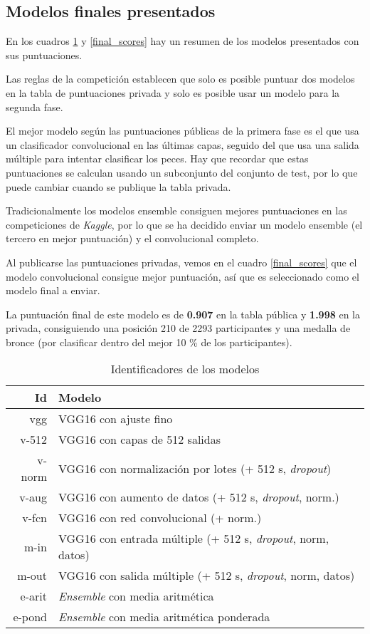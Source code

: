 \begin{itemize}
\section{Modelos finales presentados}

En los cuadros \ref{model_id} y \ref{final_scores} hay un resumen de los
modelos presentados con sus puntuaciones.

Las reglas de la competición establecen que solo es posible puntuar dos modelos en la tabla de puntuaciones privada y solo es posible usar un modelo para la segunda fase.

El mejor modelo según las puntuaciones públicas de la primera fase es el que usa un clasificador convolucional en las últimas capas, seguido del que usa una salida múltiple para intentar clasificar los peces. Hay que recordar que estas puntuaciones se calculan usando un subconjunto del conjunto de test, por lo que puede cambiar cuando se publique la tabla privada.

Tradicionalmente los modelos ensemble consiguen mejores puntuaciones en las competiciones de \textit{Kaggle}, por lo que se ha decidido enviar un modelo ensemble (el tercero en mejor puntuación) y el convolucional completo.

Al publicarse las puntuaciones privadas, vemos en el cuadro \ref{final_scores} que el modelo convolucional consigue mejor puntuación, así que es seleccionado como el modelo final a enviar.

La puntuación final de este modelo es de \textbf{0.907} en la tabla pública y \textbf{1.998} en la privada, consiguiendo una posición 210 de 2293 participantes y una medalla de bronce (por clasificar dentro del mejor 10 \% de los participantes).

\begin{table}[]
\centering
\caption{Identificadores de los modelos}
\label{model_id}
\begin{tabular}{rl}
\textbf{Id} & \textbf{Modelo}                                                       \\ \hline
vgg         & VGG16 con ajuste fino                                                 \\
v-512       & VGG16 con capas de 512 salidas                                        \\
v-norm      & VGG16 con normalización por lotes (+ 512 s, \textit{dropout})       \\
v-aug       & VGG16 con aumento de datos (+ 512 s, \textit{dropout}, norm.)       \\
v-fcn       & VGG16 con red convolucional (+ norm.)                                 \\
m-in        & VGG16 con entrada múltiple (+ 512 s, \textit{dropout}, norm, datos) \\
m-out       & VGG16 con salida múltiple (+ 512 s, \textit{dropout}, norm, datos)  \\
e-arit      & \textit{Ensemble} con media aritmética                              \\
e-pond      & \textit{Ensemble} con media aritmética ponderada                   
\end{tabular}
\end{table}


\end{itemize}
